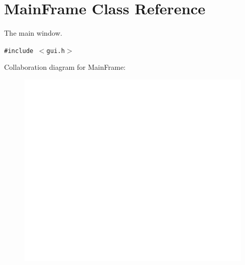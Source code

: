 \hypertarget{classMainFrame}{
\section{MainFrame Class Reference}
\label{classMainFrame}
}
The main window.  


{\tt \#include $<$gui.h$>$}

Collaboration diagram for MainFrame:\nopagebreak
\begin{figure}[H]
\begin{center}
\leavevmode
\includegraphics[width=400pt]{classMainFrame__coll__graph}
\end{center}
\end{figure}
